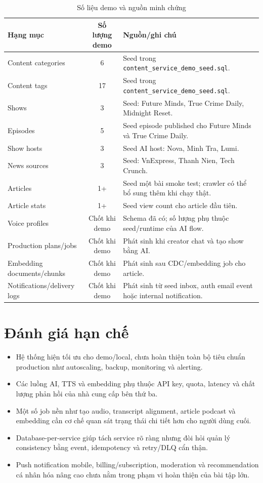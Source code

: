 \documentclass[14pt,a4paper,oneside]{extreport}
\begin{document}
\begin{table}[H]
\centering
\caption{Số liệu demo và nguồn minh chứng}
\label{tab:so-lieu-demo}
\renewcommand{\arraystretch}{1.3}
\small
\begin{tabularx}{\textwidth}{|l|c|X|}
\hline
\textbf{Hạng mục} & \textbf{Số lượng demo} & \textbf{Nguồn/ghi chú} \\
\hline
Content categories & 6 & Seed trong \texttt{content\_service\_demo\_seed.sql}. \\
\hline
Content tags & 17 & Seed trong \texttt{content\_service\_demo\_seed.sql}. \\
\hline
Shows & 3 & Seed: Future Minds, True Crime Daily, Midnight Reset. \\
\hline
Episodes & 5 & Seed episode published cho Future Minds và True Crime Daily. \\
\hline
Show hosts & 3 & Seed AI host: Nova, Minh Tra, Lumi. \\
\hline
News sources & 3 & Seed: VnExpress, Thanh Nien, Tech Crunch. \\
\hline
Articles & 1+ & Seed một bài smoke test; crawler có thể bổ sung thêm khi chạy thật. \\
\hline
Article stats & 1+ & Seed view count cho article đầu tiên. \\
\hline
Voice profiles & Chốt khi demo & Schema đã có; số lượng phụ thuộc seed/runtime của AI flow. \\
\hline
Production plans/jobs & Chốt khi demo & Phát sinh khi creator chat và tạo show bằng AI. \\
\hline
Embedding documents/chunks & Chốt khi demo & Phát sinh sau CDC/embedding job cho article. \\
\hline
Notifications/delivery logs & Chốt khi demo & Phát sinh từ seed inbox, auth email event hoặc internal notification. \\
\hline
\end{tabularx}
\end{table}

\section{Đánh giá hạn chế}
\label{sec:han-che}

\begin{itemize}[leftmargin=2cm]
  \item Hệ thống hiện tối ưu cho demo/local, chưa hoàn thiện toàn bộ tiêu chuẩn production như autoscaling, backup, monitoring và alerting.
  \item Các luồng AI, TTS và embedding phụ thuộc API key, quota, latency và chất lượng phản hồi của nhà cung cấp bên thứ ba.
  \item Một số job nền như tạo audio, transcript alignment, article podcast và embedding cần cơ chế quan sát trạng thái chi tiết hơn cho người dùng cuối.
  \item Database-per-service giúp tách service rõ ràng nhưng đòi hỏi quản lý consistency bằng event, idempotency và retry/DLQ cẩn thận.
  \item Push notification mobile, billing/subscription, moderation và recommendation cá nhân hóa nâng cao chưa nằm trong phạm vi hoàn thiện của bài tập lớn.
\end{itemize}
\end{document}
